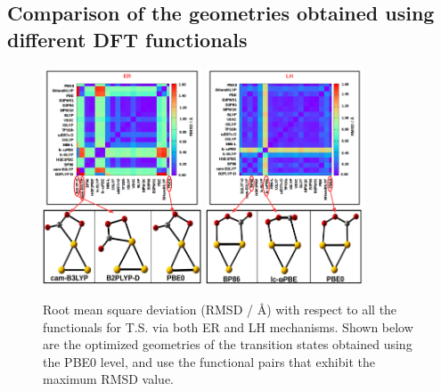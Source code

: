 \subsection{Comparison of the geometries obtained using different DFT functionals}
\begin{figure}[!t]
\begin{center}
        \centering
               \includegraphics[width=0.4195\textwidth, natwidth=610,natheight=642]{Fig5a.pdf} 
               \includegraphics[width=0.4195\textwidth, natwidth=610,natheight=642]{Fig5b.pdf} 
\caption{Root mean square deviation (RMSD / \r{A}) with respect to all the functionals for T.S. via both ER and LH mechanisms. Shown below are the optimized geometries of the transition states obtained using the PBE0 level, and use the functional pairs that exhibit the maximum RMSD value.}     \label{fig:TS}          	              
\end{center}
\end{figure}
